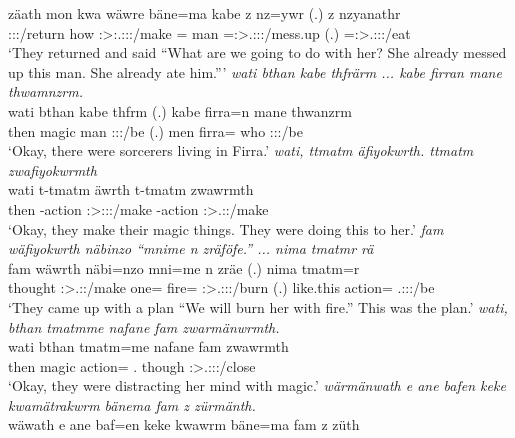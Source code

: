 \begin{exe}
	\gll zäath mon kwa wäwre bäne=ma kabe z nz=ywr (.) z nzyanathr\\
	\Stpl:\Sbj:\Pst:\Pfv/return how {\Fut} \Fpl:\Sbj>:\Tsg.\F:\Obj:\Nonpast:\Ipfv/make \Recog={\Char} man {\Iam} \Immpst=\Stsg:\Sbj>\Tsg.\Masc:\Obj:\Nonpast:\Ipfv/mess.up (.) {\Iam} \Immpst=\Stsg:\Sbj>\Tsg.\Masc:\Obj:\Nonpast:\Ipfv/eat\\
	\trans `They returned and said ``What are we going to do with her? She already messed up this man. She already ate him.'''
	\emph{wati bthan kabe thfrärm ... kabe firran mane thwamnzrm.}\\
	\gll wati bthan kabe thfrm (.) kabe firra=n mane thwanzrm\\
	then magic man \Stpl:\Sbj:\Pst:\Dur/be (.) men firra={\Loc} who \Stpl:\Sbj:\Pst:\Dur/be\\
	\trans `Okay, there were sorcerers living in Firra.'
	\emph{wati, ttmatm äfiyokwrth. ttmatm zwafiyokwrmth}\\
	\gll wati t-tmatm äwrth t-tmatm zwawrmth\\
	then \Redup-action \Stpl:\Sbj>\Stpl:\Obj:\Nonpast:\Ipfv/make \Redup-action \Stpl:\Sbj>\Tsg.\F:\Pst:\Dur/make\\
	\trans `Okay, they make their magic things. They were doing this to her.'
	\emph{fam wäfiyokwrth näbinzo ``mnime n zräföfe.'' ... nima tmatmr rä}\\
	\gll fam wäwrth näbi=nzo mni=me n zräe (.) nima tmatm=r \\
	thought \Stpl:\Sbj>\Tsg.\F:\Nonpast:\Ipfv/make one={\Only} fire={\Ins} {\Imn} \Fpl:\Sbj>\Tsg.\F:\Obj:\Irr:\Pfv/burn (.) {like.this} action={\Purp} \Tsg.\F:\Sbj:\Nonpast:\Ipfv/be\\
	\trans `They came up with a plan ``We will burn her with fire.'' This was the plan.'
	\emph{wati, bthan tmatmme nafane fam zwarmänwrmth.}\\
	\gll wati bthan tmatm=me nafane fam zwawrmth\\
	then magic action={\Ins} \Tsg.{\Poss} though \Stpl:\Sbj>\Tsg.\F:\Io:\Pst:\Dur/close\\
	\trans `Okay, they were distracting her mind with magic.'
	\emph{wärmänwath e ane bafen keke kwamätrakwrm bänema fam z zürmänth.}\\
	\gll wäwath e ane baf=en keke kwawrm bäne=ma fam z züth\\

\end{exe}
